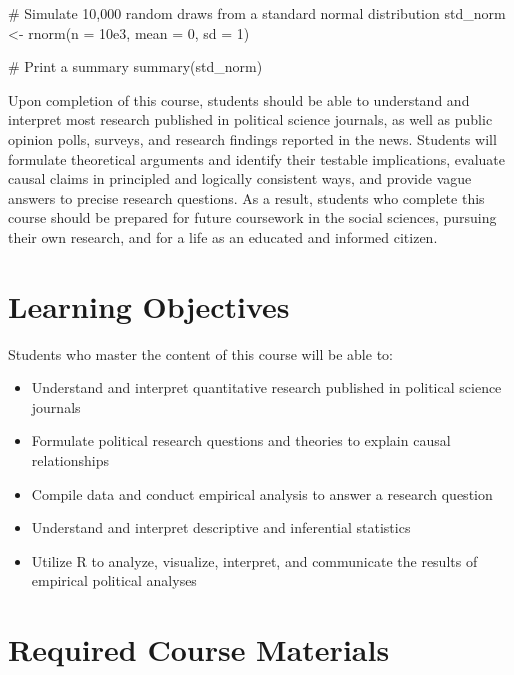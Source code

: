 \documentclass[12pt,]{article}
\newenvironment{Shaded}{}{}
\newcommand{\AttributeTok}[1]{#1}
\newcommand{\CommentTok}[1]{\textcolor[rgb]{0.00,0.50,0.00}{#1}}
\newcommand{\DecValTok}[1]{#1}
\newcommand{\FloatTok}[1]{#1}
\newcommand{\FunctionTok}[1]{#1}
\newcommand{\NormalTok}[1]{#1}
\newcommand{\OtherTok}[1]{\textcolor[rgb]{1.00,0.25,0.00}{#1}}
\begin{document}
\begin{Shaded}
\begin{Highlighting}[]
\CommentTok{\# Simulate 10,000 random draws from a standard normal distribution}
\NormalTok{std\_norm }\OtherTok{\textless{}{-}} \FunctionTok{rnorm}\NormalTok{(}\AttributeTok{n =} \FloatTok{10e3}\NormalTok{, }\AttributeTok{mean =} \DecValTok{0}\NormalTok{, }\AttributeTok{sd =} \DecValTok{1}\NormalTok{)}

\CommentTok{\# Print a summary}
\FunctionTok{summary}\NormalTok{(std\_norm)}
\end{Highlighting}
\end{Shaded}

Upon completion of this course, students should be able to understand
and interpret most research published in political science journals, as
well as public opinion polls, surveys, and research findings reported in
the news. Students will formulate theoretical arguments and identify
their testable implications, evaluate causal claims in principled and
logically consistent ways, and provide vague answers to precise research
questions. As a result, students who complete this course should be
prepared for future coursework in the social sciences, pursuing their
own research, and for a life as an educated and informed citizen.

\hypertarget{learning-objectives}{%
\section{Learning Objectives}\label{learning-objectives}}

\noindent Students who master the content of this course will be able
to:

\begin{itemize}
\item
  Understand and interpret quantitative research published in political
  science journals
\item
  Formulate political research questions and theories to explain causal
  relationships
\item
  Compile data and conduct empirical analysis to answer a research
  question
\item
  Understand and interpret descriptive and inferential statistics
\item
  Utilize R to analyze, visualize, interpret, and communicate the
  results of empirical political analyses
\end{itemize}

\hypertarget{required-course-materials}{%
\section{Required Course Materials}\label{required-course-materials}}
\end{document}
